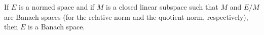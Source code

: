 If $E$ is a normed space and if $M$ is a closed linear subspace such that $M$ and $E/M$ are Banach spaces (for the relative norm and the quotient norm, respectively), then $E$ is a Banach space.

